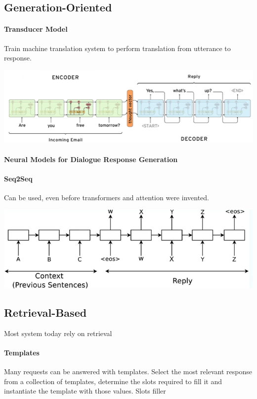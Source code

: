 \documentclass[10pt]{report}
\begin{document}
\subsection{Generation-Oriented}
\paragraph{Transducer Model} Train machine translation system to perform translation from utterance to response.
\begin{center}
	\includegraphics[scale=0.5]{121.png}
\end{center}
\paragraph{Neural Models for Dialogue Response Generation} %
\paragraph{Seq2Seq} Can be used, even before transformers and attention were invented.
\begin{center}
	\includegraphics[scale=0.5]{122.png}
\end{center}
\subsection{Retrieval-Based}
Most system today rely on retrieval
\paragraph{Templates} Many requests can be answered with templates. Select the most relevant response from a collection of templates, determine the slots required to fill it and instantiate the template with those values. Slots filler %
\end{document}
